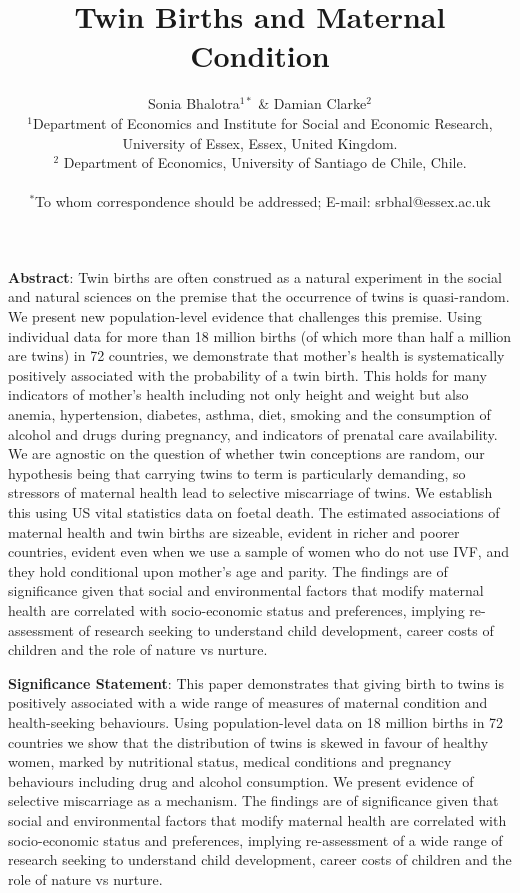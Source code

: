 \documentclass[11pt]{article}
\title{Twin Births and Maternal Condition}
\author{Sonia Bhalotra$^{1\ast}$ \& Damian Clarke$^2$      \\
  \normalsize{$^{1}$Department of Economics and Institute for Social and Economic Research,} \\
  \normalsize{University of Essex, Essex, United Kingdom.}\\
      \normalsize{$^{2}$ Department of Economics, University of Santiago de Chile, Chile.}\\
      \\
      \normalsize{$^\ast$To whom correspondence should be addressed; E-mail:  srbhal@essex.ac.uk}
    }
\date{}
\begin{document}
\baselineskip24pt

\maketitle

\noindent\textbf{Abstract}: Twin births are often construed as a natural experiment in the social and natural sciences on the premise that the occurrence of twins is quasi-random.  We present new population-level evidence that challenges this premise. Using individual data for more than 18 million births (of which more than half a million are twins) in 72 countries, we demonstrate that mother's health is systematically positively associated with the probability of a twin birth. This holds for many indicators of mother's health including not only height and weight but also anemia, hypertension, diabetes, asthma, diet, smoking and the consumption of alcohol and drugs during pregnancy, and indicators of prenatal care availability. We are agnostic on the question of whether twin conceptions are random, our hypothesis being that carrying twins to term is particularly demanding, so stressors of maternal health lead to selective miscarriage of twins. We establish this using US vital statistics data on foetal death. The estimated associations of maternal health and twin births are sizeable, evident in richer and poorer countries, evident even when we use a sample of women who do not use IVF, and they hold conditional upon mother's age and parity. The findings are of significance given that social and environmental factors that modify maternal health are correlated with socio-economic status and preferences, implying re-assessment of research seeking to understand child development, career costs of children and the role of nature vs nurture.
\vspace{4mm}

\noindent\textbf{Significance Statement}: This paper demonstrates that giving birth to twins is positively associated with a wide range of measures of maternal condition and health-seeking behaviours. Using population-level data on 18 million births in 72 countries we show that the distribution of twins is skewed in favour of healthy women, marked by nutritional status, medical conditions and pregnancy behaviours including drug and alcohol consumption. We present evidence of selective miscarriage as a mechanism. The findings are of significance given that social and environmental factors that modify maternal health are correlated with socio-economic status and preferences, implying re-assessment of a wide range of research seeking to understand child development, career costs of children and the role of nature vs nurture.
\end{document}
